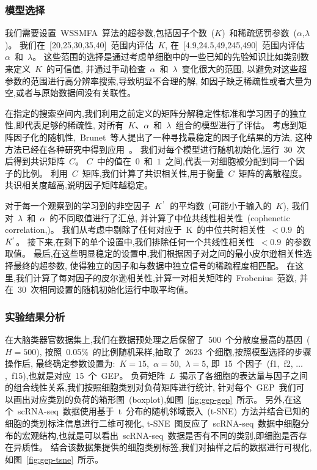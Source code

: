 \subsubsection{模型选择}
我们需要设置~WSSMFA~算法的超参数,包括因子个数~($K$)~和稀疏惩罚参数~($\alpha$,$\lambda$)。
我们在~[20,25,30,35,40]~范围内评估~$K$, 在~[4.9,24.5,49,245,490]~范围内评估~$\alpha$~和~$\lambda$。
这些范围的选择是通过考虑单细胞中的一些已知的先验知识比如类别数来定义~$K$~的可信值,
并通过手动检查~$\alpha$~和~$\lambda$~变化很大的范围,
以避免对这些超参数的范围进行高分辨率搜索,导致明显不合理的解,
如因子缺乏稀疏性或者大量为空,或者与原始数据间没有关联性。

在指定的搜索空间内,我们利用之前定义的矩阵分解稳定性标准和学习因子的独立性,即代表足够的稀疏性,
对所有~$K$、$\alpha$~和~$\lambda$~组合的模型进行了评估。
考虑到矩阵因子化的随机性,~Brunet~等人提出了一种寻找最稳定的因子化结果的方法,
这种方法已经在各种研究中得到应用~\cite{brunet2004metagenes,wu2016stability}。
我们对每个模型进行随机初始化,运行~30~次后得到共识矩阵~$C$。
$C$~中的值在~$0$~和~$1$~之间,代表一对细胞被分配到同一个因子的比例。
利用~$C$~矩阵,我们计算了共识相关性,用于衡量~$C$~矩阵的离散程度。
共识相关度越高,说明因子矩阵越稳定。

对于每一个观察到的学习到的非空因子~$K^\textup{'}$~的平均数~(可能小于输入的~$K$),
我们对~$\lambda$~和~$\alpha$~的不同取值进行了汇总,
并计算了中位共线性相关性~(cophenetic correlation,\cite{brunet2004metagenes})。
我们从考虑中剔除了任何对应于~K~的中位共时相关性~$< 0.9$~的~$K^\textup{'}$。
接下来,在剩下的单个设置中,我们排除任何一个共线性相关性~$< 0.9$~的参数取值。
最后,在这些明显稳定的设置中,我们根据因子对之间的最小皮尔逊相关性选择最终的超参数,
使得独立的因子和与数据中独立信号的稀疏程度相匹配。
在这里,我们计算了每对因子的皮尔逊相关性,计算一对相关矩阵的~Frobenius~范数, 
并在~30~次相同设置的随机初始化运行中取平均值。

\subsubsection{实验结果分析}

在大脑类器官数据集上,我们在数据预处理之后保留了~500~个分散度最高的基因~($H = 500$),
按照~0.05\%~的比例随机采样,抽取了~2623~个细胞,按照模型选择的步骤操作后,
最终确定参数设置为:~$K = 15$,~$\alpha = 50$,~$\lambda = 5$, 
即~15~个因子~(f1,~f2, $\ldots$,~f15),也就是对应~15~个~GEP。
负荷矩阵~$L$~揭示了各细胞的表达量与因子之间的组合线性关系,我们按照细胞类别对负荷矩阵进行统计,
针对每个~GEP~我们可以画出对应类别的负荷的箱形图~(boxplot),如图~\ref{fig:gep-gep}~所示。
另外,在这个~scRNA-seq~数据使用基于~t~分布的随机邻域嵌入~(t-SNE)~方法并结合已知的细胞的类别标注信息进行二维可视化,
t-SNE~图反应了~scRNA-seq~数据中细胞分布的宏观结构,也就是可以看出~scRNA-seq~数据是否有不同的类别,即细胞是否存在异质性。
结合该数据集提供的细胞类别标签,我们对抽样之后的数据进行可视化,如图~\ref{fig:gep-tsne}~所示。

